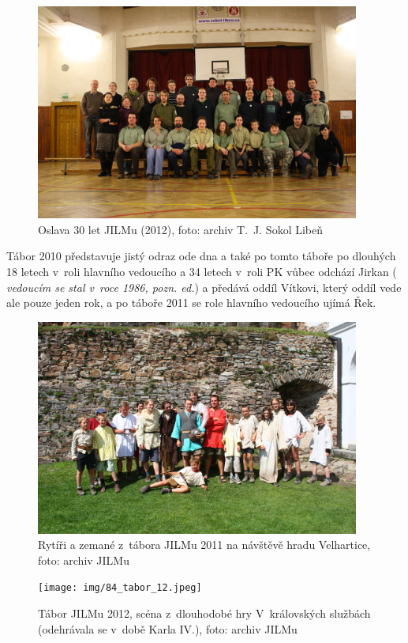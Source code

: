 \documentclass[a5paper, 11pt, twoside]{article}
\newcommand{\pozned}[1]{%
\textit{#1}}
\begin{document}
\begin{figure}[h]
  \centering 
  \includegraphics[width=0.95\textwidth]{img/82_jilm_30.JPG}
  \caption*{Oslava 30 let JILMu (2012), foto: archiv T.~J. Sokol Libeň}
\end{figure}

Tábor 2010 představuje jistý odraz ode dna a také po tomto táboře po
dlouhých 18 letech v~roli hlavního vedoucího a 34 letech v~roli PK vůbec
odchází Jirkan (\pozned{vedoucím se stal v~roce 1986, pozn. ed.}) a předává oddíl
Vítkovi, který oddíl vede ale pouze jeden rok, a po táboře 2011 se role
hlavního vedoucího ujímá Řek.

\begin{figure}[h!]
  \centering 
  \includegraphics[width=0.95\textwidth]{img/83_tabor_11.jpg}
  \caption*{Rytíři a zemané z~tábora JILMu 2011 na návštěvě hradu Velhartice,
  foto: archiv JILMu}
\end{figure}

\begin{figure}[h!]
  \centering 
  \texttt{[image: img/84\_tabor\_12.jpeg]}
  \caption*{Tábor JILMu 2012, scéna z~dlouhodobé hry V~královských službách
  (odehrávala se v~době Karla IV.), foto: archiv JILMu}
\end{figure}
\end{document}
